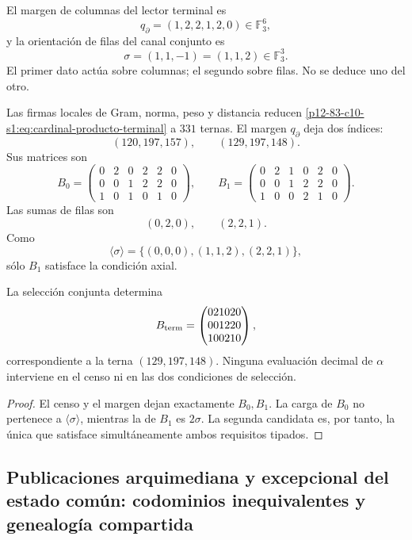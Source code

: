 El margen de columnas del lector terminal es
\[
 q_\partial=(1,2,2,1,2,0)\in\mathbb F_3^6,
\]
y la orientación de filas del canal conjunto es
\[
 \sigma=(1,1,-1)=(1,1,2)\in\mathbb F_3^3.
\]
El primer dato actúa sobre columnas; el segundo sobre filas. No se deduce
uno del otro.

Las firmas locales de Gram, norma, peso y distancia reducen
\eqref{p12-83-c10-s1:eq:cardinal-producto-terminal} a \(331\) ternas. El margen
\(q_\partial\) deja dos índices:
\[
 (120,197,157),
 \qquad
 (129,197,148).
\]
Sus matrices son
\[
 B_0=
 \begin{pmatrix}
 0&2&0&2&2&0\\
 0&0&1&2&2&0\\
 1&0&1&0&1&0
 \end{pmatrix},
 \qquad
 B_1=
 \begin{pmatrix}
 0&2&1&0&2&0\\
 0&0&1&2&2&0\\
 1&0&0&2&1&0
 \end{pmatrix}.
\]
Las sumas de filas son
\[
 (0,2,0),
 \qquad
 (2,2,1).
\]
Como
\[
 \langle\sigma\rangle
 =\{(0,0,0),(1,1,2),(2,2,1)\},
\]
sólo \(B_1\) satisface la condición axial.

\begin{theorem}
\label{p12-83-c10-s1:thm:unicidad-publicacion-terminal-visible}
La selección conjunta determina
\begin{equation}
 B_{\rm term}=
 \begin{pmatrix}
 021020\\001220\\100210
 \end{pmatrix},
 \label{p12-83-c10-s1:eq:matriz-terminal-visible}
\end{equation}
correspondiente a la terna \((129,197,148)\). Ninguna evaluación decimal de
\(\alpha\) interviene en el censo ni en las dos condiciones de selección.
\end{theorem}

\begin{proof}
El censo y el margen dejan exactamente \(B_0,B_1\). La carga de \(B_0\)
no pertenece a \(\langle\sigma\rangle\), mientras la de \(B_1\) es
\(2\sigma\). La segunda candidata es, por tanto, la única que satisface
simultáneamente ambos requisitos tipados.
\end{proof}

\subsection{Publicaciones arquimediana y excepcional del estado común: codominios inequivalentes y genealogía compartida}


